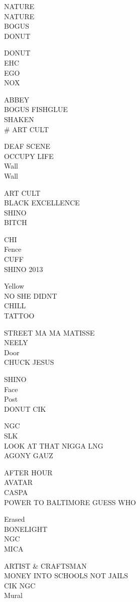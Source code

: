 \documentclass[10pt,letterpaper]{article}
\begin{document}
NATURE\\
NATURE\\
BOGUS\\
DONUT

DONUT\\
EHC\\
EGO\\
NOX

ABBEY\\
BOGUS FISHGLUE\\
SHAKEN\\
\# ART CULT

DEAF SCENE\\
OCCUPY LIFE\\
Wall\\
Wall

ART CULT\\
BLACK EXCELLENCE\\
SHINO\\
BITCH

CHI\\
Fence\\
CUFF\\
SHINO 2013

Yellow\\
NO SHE DIDNT\\
CHILL\\
TATTOO

STREET MA MA MATISSE\\
NEELY\\
Door\\
CHUCK JESUS

SHINO\\
Face\\
Post\\
DONUT CIK

NGC\\
SLK\\
LOOK AT THAT NIGGA LNG\\
AGONY GAUZ

AFTER HOUR\\
AVATAR\\
CASPA\\
POWER TO BALTIMORE GUESS WHO

Erased\\
BONELIGHT\\
NGC\\
MICA

ARTIST \& CRAFTSMAN\\
MONEY INTO SCHOOLS NOT JAILS\\
CIK NGC\\
Mural
\end{document}
